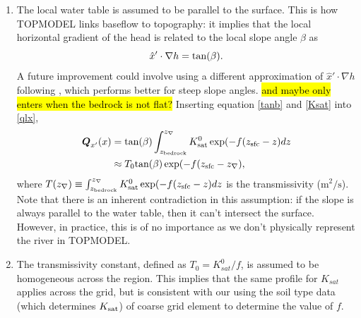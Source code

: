\documentclass[twoside,10pt]{report}
\begin{document}
\begin{enumerate}
   \item The local water table is assumed to be parallel to the surface. This is how TOPMODEL links baseflow to topography: it implies that the local horizontal gradient of the head is related to the local slope angle $\beta$ as 
    \begin{equation}
   \hat{x}' \cdot \nabla h    = \rm tan (\beta). 
    \label{tanb}
    \end{equation}
    A future improvement could involve using a different approximation of $ \hat{x}' \cdot \nabla h$ following \citep{beven2001dynamic}, which performs better for steep slope angles. \hl{and maybe only enters when the bedrock is not flat?}
    Inserting equation \ref{tanb} and \ref{Ksat} into \ref{qlx}, 
    \begin{align}\label{int_q_runoff}
   \vec{Q}_{x'}(x) &= \mathrm{tan(\beta)} \int_{z_{\rm bedrock}}^{z_{\nabla}} K_{\rm sat}^0\exp(-f (z_{\rm sfc}- z) dz \nonumber \\
   &\approx T_0 \mathrm{tan(\beta)} \exp(-f (z_{\rm sfc}-z_{\nabla}), 
    \end{align}
    where $T(z_{\nabla}) \equiv \int_{z_{\rm bedrock}}^{z_{\nabla}} K_{\rm sat}^0\exp(-f (z_{\rm sfc}- z) dz$ is the transmissivity ($\mathrm{m^2/s}$). Note that there is an inherent contradiction in this assumption: if the slope is always parallel to the water table, then it can't intersect the surface. However, in practice, this is of no importance as we don't physically represent the river in TOPMODEL. 
    \item The transmissivity constant, defined as $T_0 = K_{sat}^0/f$, is assumed to be homogeneous across the region. This implies that the same profile for $K_{sat}$ applies across the grid, but is consistent with our using the soil type data (which determines $K_{\rm sat}$) of coarse grid element to determine the value of $f$. 
   

\end{enumerate}
\end{document}
